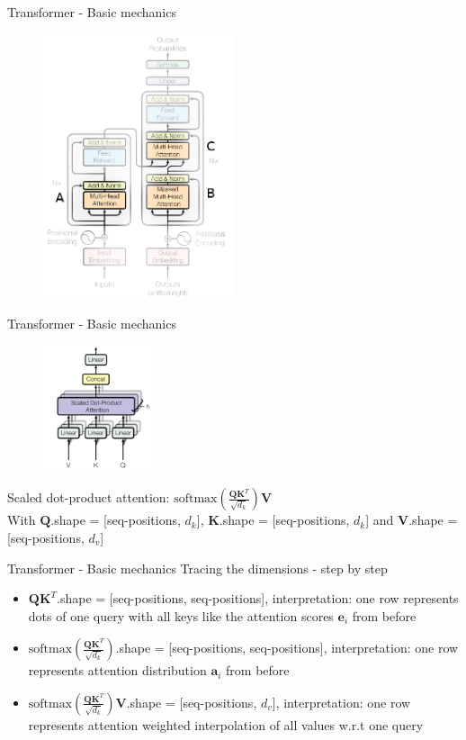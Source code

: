 \documentclass{beamer}
\begin{document}
\begin{frame}{Transformer - Basic mechanics}
\begin{figure}[t]
	\includegraphics[width=0.5\textwidth]{figures/vaswani-trans.png}
\end{figure}
\end{frame}

\begin{frame}{Transformer - Basic mechanics}
\begin{figure}[t]
	\includegraphics[width=0.3\textwidth]{figures/multi-head-attn.png}
\end{figure}
Scaled dot-product attention: $\text{softmax}(\frac{\mathbf{Q}\mathbf{K}^T}{\sqrt{d_k}})\mathbf{V}$
\\
With $\mathbf{Q}$.shape = [seq-positions, $d_k$], $\mathbf{K}$.shape = [seq-positions, $d_k$] and $\mathbf{V}$.shape = [seq-positions, $d_v$]
\end{frame}

\begin{frame}{Transformer - Basic mechanics}
	Tracing the dimensions - step by step
	\begin{itemize}
		\item $\mathbf{Q}\mathbf{K}^T$.shape = [seq-positions, seq-positions], interpretation: one row represents dots of one query with all keys like the attention scores $\mathbf{e}_i$ from before
		\item $\text{softmax}(\frac{\mathbf{Q}\mathbf{K}^T}{\sqrt{d_k}})$.shape = [seq-positions, seq-positions], interpretation: one row represents attention distribution $\mathbf{a}_i$ from before
		\item $\text{softmax}(\frac{\mathbf{Q}\mathbf{K}^T}{\sqrt{d_k}})\mathbf{V}$.shape = [seq-positions, $d_v$], interpretation: one row represents attention weighted interpolation of all values w.r.t one query
	\end{itemize}
\end{frame}
\end{document}
